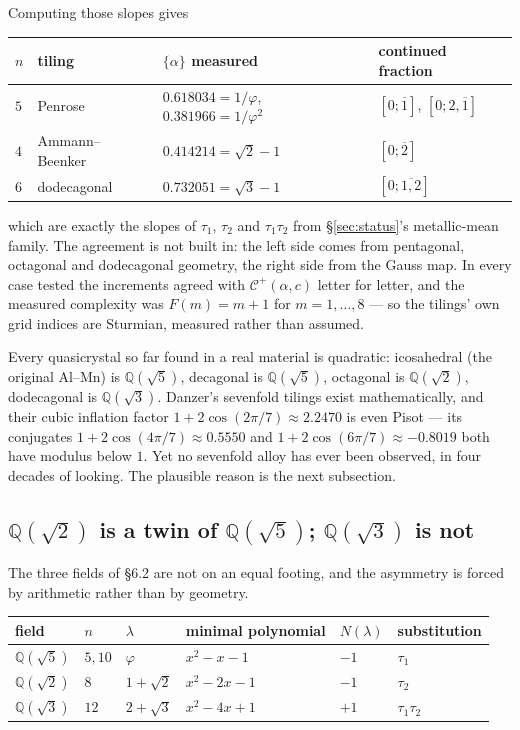 \documentclass[11pt,a4paper]{article}
\newcommand{\Cp}{\mathcal{C}^{+}}
\newcommand{\Q}{\mathbb{Q}}
\theoremstyle{definition}
\theoremstyle{plain}
\begin{document}
Computing those slopes gives

\begin{center}
\begin{tabular}{llll}
\toprule
$n$ & tiling & $\{\alpha\}$ measured & continued fraction \\
\midrule
$5$ & Penrose & $0.618034 = 1/\varphi$, $0.381966 = 1/\varphi^2$ & $[0;\overline{1}]$, $[0;2,\overline{1}]$ \\
$4$ & Ammann--Beenker & $0.414214 = \sqrt 2 - 1$ & $[0;\overline{2}]$ \\
$6$ & dodecagonal & $0.732051 = \sqrt 3 - 1$ & $[0;\overline{1,2}]$ \\
\bottomrule
\end{tabular}
\end{center}

which are exactly the slopes of $\tau_1$, $\tau_2$ and $\tau_1\tau_2$ from
\S\ref{sec:status}'s metallic-mean family. The agreement is not built in: the
left side comes from pentagonal, octagonal and dodecagonal geometry, the right
side from the Gauss map. In every case tested the increments agreed with
$\Cp(\alpha,c)$ letter for letter, and the measured complexity was
$F(m) = m+1$ for $m = 1,\dots,8$ --- so the tilings' own grid indices are
Sturmian, measured rather than assumed.

Every quasicrystal so far found in a real material is quadratic: icosahedral
(the original Al--Mn) is $\Q(\sqrt 5)$, decagonal is $\Q(\sqrt 5)$, octagonal
is $\Q(\sqrt 2)$, dodecagonal is $\Q(\sqrt 3)$. Danzer's sevenfold tilings exist
mathematically, and their cubic inflation factor
$1 + 2\cos(2\pi/7) \approx 2.2470$ is even Pisot --- its conjugates
$1+2\cos(4\pi/7) \approx 0.5550$ and $1+2\cos(6\pi/7) \approx -0.8019$ both have
modulus below $1$. Yet no sevenfold alloy has ever been observed, in four
decades of looking. The plausible reason is the next subsection.

\subsection{$\Q(\sqrt 2)$ is a twin of $\Q(\sqrt 5)$; $\Q(\sqrt 3)$ is not}

The three fields of \S6.2 are not on an equal footing, and the asymmetry is
forced by arithmetic rather than by geometry.

\begin{center}
\begin{tabular}{llllll}
\toprule
field & $n$ & $\lambda$ & minimal polynomial & $N(\lambda)$ & substitution \\
\midrule
$\Q(\sqrt 5)$ & $5, 10$ & $\varphi$      & $x^2 - x - 1$  & $-1$ & $\tau_1$ \\
$\Q(\sqrt 2)$ & $8$     & $1 + \sqrt 2$  & $x^2 - 2x - 1$ & $-1$ & $\tau_2$ \\
$\Q(\sqrt 3)$ & $12$    & $2 + \sqrt 3$  & $x^2 - 4x + 1$ & $+1$ & $\tau_1\tau_2$ \\
\bottomrule
\end{tabular}
\end{center}
\end{document}
